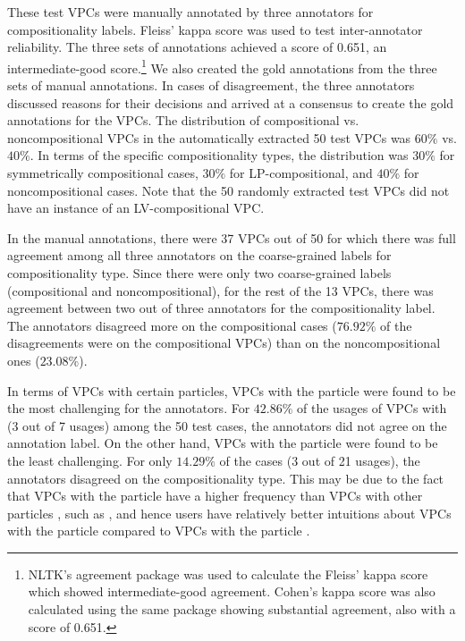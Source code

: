 \documentclass[output=paper,modfonts,nonflat]{langsci/langscibook}
\begin{document}
These test VPCs were manually annotated by three annotators for compositionality labels. Fleiss' kappa score \citep{Fle71} was used to test inter-annotator reliability. The three sets of annotations achieved a score of 0.651, an intermediate-good score.\footnote{NLTK's agreement package was used to calculate the Fleiss' kappa score which showed intermediate-good agreement. Cohen's kappa score \citep{Coh60} was also calculated using the same package showing substantial agreement, also with a score of 0.651.} We also created the gold annotations from the three sets of manual annotations. In cases of disagreement, the three annotators discussed reasons for their decisions and arrived at a consensus to create the gold annotations for the VPCs. The distribution of compositional vs. noncompositional VPCs in the automatically extracted 50 test VPCs was $60\%$ vs. $40\%$. In terms of the specific compositionality types, the distribution was $30\%$ for symmetrically compositional cases, $30\%$ for LP-compositional, and $40\%$ for noncompositional cases. Note that the 50 randomly extracted test VPCs did not have an instance of an LV-compositional VPC.

In the manual annotations, there were 37 VPCs out of 50 for which there was full agreement among all three annotators on the coarse-grained labels for compositionality type. Since there were only two coarse-grained labels (compositional and noncompositional), for the rest of the 13 VPCs, there was agreement between two out of three annotators for the compositionality label. The annotators disagreed more on the compositional cases ($76.92\%$ of the disagreements were on the compositional VPCs) than on the noncompositional ones ($23.08\%$).

In terms of VPCs with certain particles, VPCs with the particle  were found to be the most challenging for the annotators. For $42.86\%$ of the usages of VPCs with  (3 out of 7 usages) among the 50 test cases, the annotators did not agree on the annotation label. On the other hand, VPCs with the particle  were found to be the least challenging. For only $14.29\%$ of the cases (3 out of 21 usages), the annotators disagreed on the compositionality type. This may be due to the fact that VPCs with the particle  have a higher frequency than VPCs with other particles \citep{Vil06}, such as , and hence users have relatively better intuitions about VPCs with the particle  compared to VPCs with the particle .
\end{document}
